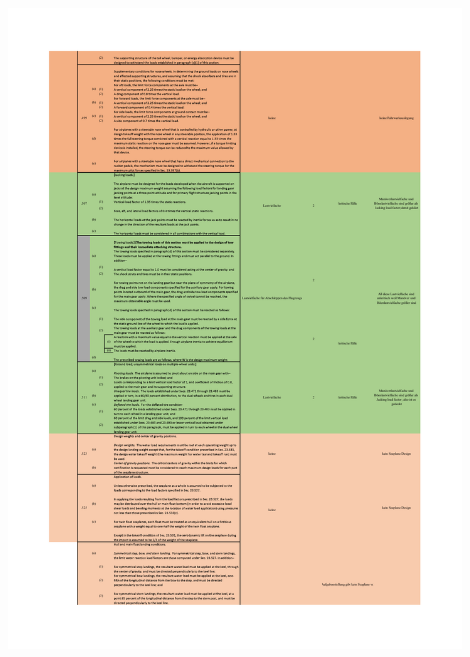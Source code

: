 \begin{table}[H]
\centering
\includegraphics[width=0.9\textwidth]{bilder/Tabellen/MPP_Konstruktion_8.pdf}
\end{table}

